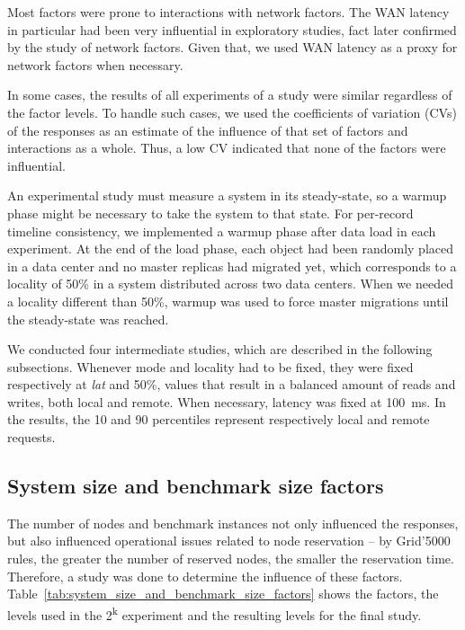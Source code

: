 \documentclass[man,floatsintext,12pt]{apa6}
\begin{document}
Most factors were prone to interactions with network factors. The WAN latency
in particular had been very influential in exploratory studies, fact later
confirmed by the study of network factors. Given that, we used WAN latency as a
proxy for network factors when necessary.

In some cases, the results of all experiments of a study were similar
regardless of the factor levels. To handle such cases, we used the coefficients
of variation (CVs) of the responses as an estimate of the influence of that set
of factors and interactions as a whole. Thus, a low CV indicated that none of
the factors were influential.

An experimental study must measure a system in its steady-state, so a warmup
phase might be necessary to take the system to that state. For per-record
timeline consistency, we implemented a warmup phase after data load in each
experiment. At the end of the load phase, each object had been randomly placed
in a data center and no master replicas had migrated yet, which corresponds to
a locality of 50\% in a system distributed across two data centers. When we
needed a locality different than 50\%, warmup was used to force master
migrations until the steady-state was reached.

We conducted four intermediate studies, which are described in the following
subsections. Whenever mode and locality had to be fixed, they were fixed
respectively at \textit{lat} and 50\%, values that result in a balanced amount
of reads and writes, both local and remote. When necessary, latency was fixed
at 100~ms. In the results, the 10 and 90 percentiles represent respectively
local and remote requests.

\subsection{System size and benchmark size factors}

The number of nodes and benchmark instances not only influenced the responses,
but also influenced operational issues related to node reservation -- by
Grid'5000 rules, the greater the number of reserved nodes, the smaller the
reservation time. Therefore, a study was done to determine the influence of
these factors. Table~\ref{tab:system_size_and_benchmark_size_factors} shows the
factors, the levels used in the 2\textsuperscript{k} experiment and the
resulting levels for the final study.
\end{document}
